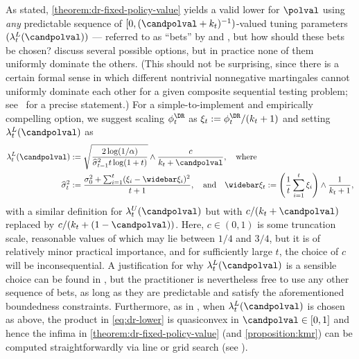 \begin{remark}\label{remark:choosing-lambda}
  As stated, \cref{theorem:dr-fixed-policy-value} yields a valid lower \cs{} for $\polval$ using \emph{any} predictable sequence of $[0, (\candpolval + k_t)^{-1})$-valued tuning parameters $(\lambda_t^L(\candpolval))$ --- referred to as ``bets'' by \citet{karampatziakis2021off} and \citet{waudby2020estimating}, but how should these bets be chosen? \citet[Appendix B]{waudby2020estimating} discuss several possible options, but in practice none of them uniformly dominate the others. (This should not be surprising, since there is a certain formal sense in which different nontrivial nonnegative martingales cannot uniformly dominate each other for a given composite sequential testing problem; see~\citet{ramdas2020admissible} for a precise statement.) For a simple-to-implement and empirically compelling option, we suggest scaling $\phi_t^\DR$ as $\xi_t := \phi_t^\DR / (k_t + 1)$ and setting $\lambda_t^L(\candpolval)$ as
  \begin{align}
    \lambda_t^L(\candpolval) &:= \sqrt{\frac{2 \log(1/\alpha)}{\widehat \sigma_{t-1}^2 t\log (1 + t)}} \land \frac{c}{k_t + \candpolval},~~~\text{where}\label{eq:betting-strategy-prpl}\\
    \widehat \sigma_t^2 &:= \frac{\sigma_0^2 + \sum_{i=1}^t (\xi_i - \widebar \xi_{i})^2}{t + 1},~~~\text{and}~~~\widebar \xi_t := \left ( \frac{1}{t}\sum_{i=1}^t \xi_i\right ) \land \frac{1}{k_t+1} \label{eq:betting-strategy-prpl-sigmahat2},
  \end{align}
  with a similar definition for $\lambda_t^U(\candpolval)$ but with $c/(k_t + \candpolval)$ replaced by $c/(k_t + (1-\candpolval))$. Here, $c \in (0, 1)$ is some truncation scale, reasonable values of which may lie between $1/4$ and $3/4$, but it is of relatively minor practical importance, and for sufficiently large $t$, the choice of $c$ will be inconsequential. A justification for why $\lambda_t^L(\candpolval)$ is a sensible choice can be found in \citet[Section B.1]{waudby2020estimating}, but the practitioner is nevertheless free to use any other sequence of bets, as long as they are predictable and satisfy the aforementioned boundedness constraints. Furthermore, as in \citet{waudby2020estimating}, when $\lambda_t^L(\candpolval)$ is chosen as above, the product in \eqref{eq:dr-lower} is quasiconvex in $\candpolval \in [0, 1]$ and hence the infima in \cref{theorem:dr-fixed-policy-value} (and \cref{proposition:kmr}) can be computed straightforwardly via line or grid search (see \citet[Section A.5]{waudby2020estimating}).
  

\end{remark}
